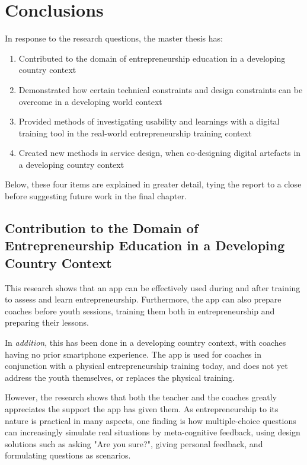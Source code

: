 \chapter{Conclusions}\label{cha:conclusion}


In response to the research questions, the master thesis has: %

\begin{enumerate}
\item Contributed to the domain of entrepreneurship education in a developing country context
\item Demonstrated how certain technical constraints and design constraints can be overcome in a developing world context
\item Provided methods of investigating usability and learnings with a digital training tool in the real-world entrepreneurship training context
\item Created new methods in service design, when co-designing digital artefacts in a developing country context
\end{enumerate}

Below, these four items are explained in greater detail, tying the report to a close before suggesting future work in the final chapter.

\section{Contribution to the Domain of Entrepreneurship Education in a Developing Country Context}
This research shows that an app can be effectively used during and after training to assess and learn entrepreneurship. Furthermore, the app can also prepare coaches before youth sessions, training them both in entrepreneurship and preparing their lessons.

In \textit{addition}, this has been done in a developing country context, with coaches having no prior smartphone experience. The app is used for coaches in conjunction with a physical entrepreneurship training today, and does not yet address the youth themselves, or replaces the physical training.

However, the research shows that both the teacher and the coaches greatly appreciates the support the app has given them. As entrepreneurship to its nature is practical in many aspects, one finding is how multiple-choice questions can increasingly simulate real situations by meta-cognitive feedback, using design solutions such as asking "Are you sure?", giving personal feedback, and formulating questions as scenarios.

